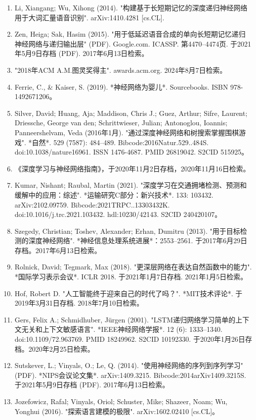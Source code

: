 \begin{enumerate}
\item Li, Xiangang; Wu, Xihong (2014). "构建基于长短期记忆的深度递归神经网络用于大词汇量语音识别". arXiv:1410.4281 [cs.CL].
\item Zen, Heiga; Sak, Hasim (2015). "用于低延迟语音合成的单向长短期记忆递归神经网络与递归输出层" (PDF). Google.com. ICASSP. 第4470–4474页. 于2021年5月9日存档 (PDF). 2017年6月13日检索。
\item "2018年ACM A.M.图灵奖得主". awards.acm.org. 2024年8月7日检索。
\item Ferrie, C., & Kaiser, S. (2019). *神经网络为婴儿*. Sourcebooks. ISBN 978-1492671206。
\item Silver, David; Huang, Aja; Maddison, Chris J.; Guez, Arthur; Sifre, Laurent; Driessche, George van den; Schrittwieser, Julian; Antonoglou, Ioannis; Panneershelvam, Veda (2016年1月). "通过深度神经网络和树搜索掌握围棋游戏". *自然*. 529 (7587): 484–489. Bibcode:2016Natur.529..484S. doi:10.1038/nature16961. ISSN 1476-4687. PMID 26819042. S2CID 515925。
\item 《深度学习与神经网络指南》，于2020年11月2日存档，2020年11月16日检索。
\item Kumar, Nishant; Raubal, Martin (2021). "深度学习在交通拥堵检测、预测和缓解中的应用：综述". *运输研究C部分：新兴技术*. 133: 103432. arXiv:2102.09759. Bibcode:2021TRPC..13303432K. doi:10.1016/j.trc.2021.103432. hdl:10230/42143. S2CID 240420107。
\item Szegedy, Christian; Toshev, Alexander; Erhan, Dumitru (2013). "用于目标检测的深度神经网络". *神经信息处理系统进展*：2553–2561. 于2017年6月29日存档。2017年6月13日检索。
\item Rolnick, David; Tegmark, Max (2018). "更深层网络在表达自然函数中的能力". *国际学习表示会议*. ICLR 2018. 于2021年1月7日存档. 2021年1月5日检索。
\item Hof, Robert D. "人工智能终于迎来自己的时代了吗？". *MIT技术评论*. 于2019年3月31日存档. 2018年7月10日检索。
\item Gers, Felix A.; Schmidhuber, Jürgen (2001). "LSTM递归网络学习简单的上下文无关和上下文敏感语言". *IEEE神经网络学报*. 12 (6): 1333–1340. doi:10.1109/72.963769. PMID 18249962. S2CID 10192330. 于2020年1月26日存档。2020年2月25日检索。
\item Sutskever, L.; Vinyals, O.; Le, Q. (2014). "使用神经网络的序列到序列学习" (PDF). *NIPS会议论文集*. arXiv:1409.3215. Bibcode:2014arXiv1409.3215S. 于2021年5月9日存档 (PDF). 2017年6月13日检索。
\item Jozefowicz, Rafal; Vinyals, Oriol; Schuster, Mike; Shazeer, Noam; Wu, Yonghui (2016). "探索语言建模的极限". arXiv:1602.02410 [cs.CL]。

\end{enumerate}
